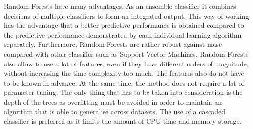 Random Forests have many advantages. As an ensemble classifier it combines
decisions of multiple classifiers to form an integrated output. This way of
working has the advantage that a better predictive performance is obtained
compared to the predictive performance demonstrated by each individual learning
algorithm separately. Furthermore, Random Forests are rather robust against
noise compared with other classifier such as Support Vector Machines. Random
Forests also allow to use a lot of features, even if they have different orders
of magnitude, without increasing the time complexity too much. The features also
do not have to be known in advance. At the same time, the method does not
require a lot of parameter tuning. The only thing that has to be taken into
consideration is the depth of the trees as overfitting must be avoided in order
to maintain an algorithm that is able to generalise across datasets. The use of
a cascaded classifier is preferred as it limits the amount of CPU time and
memory storage.
 
